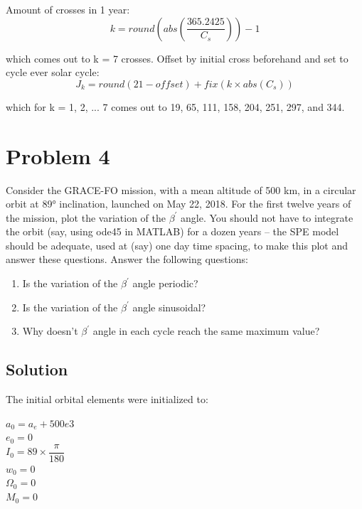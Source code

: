 \documentclass[conf]{new-aiaa}
\begin{document}
Amount of crosses in 1 year: 
\begin{equation}
	k = round(abs(\dfrac{365.2425}{C_s})) - 1
\end{equation}

which comes out to k = 7 crosses. Offset by initial cross beforehand and set to cycle ever solar cycle: 
\begin{equation}
	J_k = round(21 - offset) + fix(k \times abs(C_s))
\end{equation}

which for k = 1, 2, ... 7 comes out to 19, 65, 111, 158, 204, 251, 297, and 344. 







\newpage 
\section*{Problem 4}

Consider the GRACE-FO mission, with a mean altitude of 500 km, in a circular orbit at 89°
inclination, launched on May 22, 2018. For the first twelve years of the mission, plot the
variation of the $\beta ^\prime$ angle. You should not have to integrate the orbit (say, using ode45 in
MATLAB) for a dozen years – the SPE model should be adequate, used at (say) one day time
spacing, to make this plot and answer these questions. Answer the following questions: \newline 

\begin{enumerate}
	\item Is the variation of the $\beta ^\prime$ angle periodic? 
	\item Is the variation of the $\beta ^\prime$ angle sinusoidal? 
	\item Why doesn't $\beta ^\prime$ angle in each cycle reach the same maximum value? 
\end{enumerate}

\subsection*{Solution}

The initial orbital elements were initialized to: 

\begin{center}
	$a_0 = a_e + 500e3$ \\ 
	$e_0 = 0$ \\ 
	$I_0 = 89 \times \dfrac{\pi}{180}$ \\ 
	$w_0 = 0$ \\ 
	$\Omega_0 = 0$ \\ 
	$M_0 = 0$ \\ 
\end{center}
\end{document}
